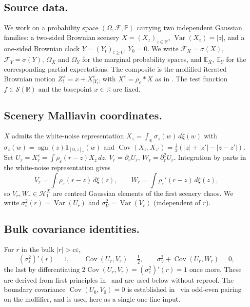 \documentclass[11pt,reqno]{amsart}
\theoremstyle{plain}
\theoremstyle{definition}
\theoremstyle{remark}
\newcommand{\R}{\mathbb{R}}
\newcommand{\E}{\mathbb{E}}
\newcommand{\Prob}{\mathbb{P}}
\newcommand{\Hilb}{\mathcal{H}}
\newcommand{\IBM}{Z}
\DeclareMathOperator{\Var}{Var}
\DeclareMathOperator{\Cov}{Cov}
\DeclareMathOperator{\sgn}{sgn}
\begin{document}
\subsection*{Source data.}
We work on a probability space $(\Omega,\mathcal F,\Prob)$ carrying
two independent Gaussian families: a two-sided Brownian scenery
$X=(X_z)_{z\in\R}$, $\Var(X_z)=|z|$, and a one-sided Brownian clock
$Y=(Y_t)_{t\ge 0}$, $Y_0=0$. We write
$\mathcal F_X=\sigma(X)$, $\mathcal F_Y=\sigma(Y)$, $\Omega_X$ and
$\Omega_Y$ for the marginal probability spaces, and $\E_X$, $\E_Y$
for the corresponding partial expectations. The composite is the
mollified iterated Brownian motion
$\IBM_t^{\,\varepsilon}=x+X^\varepsilon_{|Y_t|}$ with
$X^\varepsilon=\rho_\varepsilon*X$ as in
. The test function $f\in\mathscr S(\R)$ and the
basepoint $x\in\R$ are fixed.

\subsection*{Scenery Malliavin coordinates.}
$X$ admits the white-noise representation
$X_z=\int_\R\sigma_z(w)\,d\xi(w)$ with
$\sigma_z(w)=\sgn(z)\mathbf 1_{[0,z]_*}(w)$ and
$\Cov(X_z,X_{z'})=\tfrac12(|z|+|z'|-|z-z'|)$. Set
$U_r=X^\varepsilon_r=\int\rho_\varepsilon(r-z)X_z\,dz$,
$V_r=\partial_rU_r$, $W_r=\partial_r^2U_r$. Integration by parts in
the white-noise representation gives
\begin{equation}\label{eq:VW-rep}
 V_r=\int\rho_\varepsilon(r-z)\,d\xi(z),\qquad
 W_r=\int\rho_\varepsilon'(r-z)\,d\xi(z),
\end{equation}
so $V_r,W_r\in\Hilb_1^X$ are centred Gaussian elements of the first
scenery chaos. We write $\sigma_\varepsilon^2(r)=\Var(U_r)$ and
$\sigma_V^2=\Var(V_r)$ (independent of $r$).

\subsection*{Bulk covariance identities.}
For $r$ in the bulk $|r|>c\varepsilon$,
\begin{equation}\label{eq:bulk-cov}
 (\sigma_\varepsilon^2)'(r)=1,\qquad
 \Cov(U_r,V_r)=\tfrac12,\qquad
 \sigma_V^2+\Cov(U_r,W_r)=0,
\end{equation}
the last by differentiating
$2\Cov(U_r,V_r)=(\sigma_\varepsilon^2)'(r)=1$ once more. These are
derived from first principles in~\cite[Sec.\ 3]{Fontes-FCDC} and are
used below without reproof. The boundary covariance
$\Cov(U_0,V_0)=0$ is established in~\cite[Lem.\ 3.2]{Fontes-FCDC}
via odd-even pairing on the mollifier, and is used here as a
single one-line input.
\end{document}
